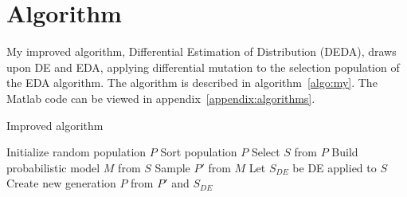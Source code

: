 \section{Algorithm}

My improved algorithm, Differential Estimation of Distribution (DEDA), draws upon DE and EDA, applying differential mutation to the selection population of the EDA algorithm. The algorithm is described in algorithm~\ref{algo:my}. The Matlab code can be viewed in appendix~\ref{appendix:algorithms}.


\begin{algorithm}[h]
  \caption{Improved algorithm}
  \label{algo:my}
    \begin{algorithmic}
      \State Initialize random population $P$
      \Repeat
        \State Sort population $P$
        \State Select $S$ from $P$
        \State Build probabilistic model $M$ from $S$
        \State Sample $P'$ from $M$
        \State Let $S_{DE}$ be DE applied to $S$
        \State Create new generation $P$ from $P'$ and $S_{DE}$
    \end{algorithmic}

\end{algorithm}
